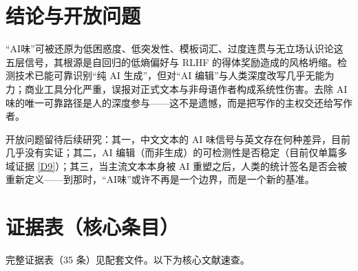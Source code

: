 \documentclass[10pt,a4paper]{ctexart}
\begin{document}
\section{结论与开放问题}

\begin{justifying}
“AI味”可被还原为低困惑度、低突发性、模板词汇、过度连贯与无立场认识论这五层信号，其根源是自回归的低熵偏好与 RLHF 的得体奖励造成的风格坍缩。检测技术已能可靠识别“纯 AI 生成”，但对“AI 编辑”与人类深度改写几乎无能为力；商业工具分化严重，误报对正式文本与非母语作者构成系统性伤害。去除 AI 味的唯一可靠路径是人的深度参与——这不是遗憾，而是把写作的主权交还给写作者。

开放问题留待后续研究：其一，中文文本的 AI 味信号与英文存在何种差异，目前几乎没有实证；其二，AI 编辑（而非生成）的可检测性是否稳定（目前仅单篇多域证据 \href{https://arxiv.org/abs/2608.27855}{[D9]}）；其三，当主流文本本身被 AI 重塑之后，人类的统计签名是否会被重新定义——到那时，“AI味”或许不再是一个边界，而是一个新的基准。

\end{justifying}

\newpage
\appendix
\section{证据表（核心条目）}
完整证据表（35 条）见配套文件。以下为核心文献速查。
\end{document}
